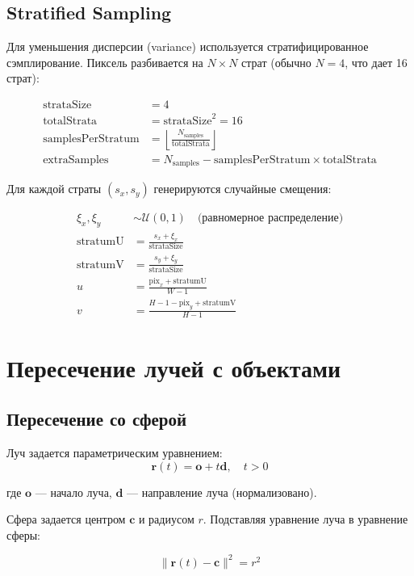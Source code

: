 \documentclass[14pt, a4paper]{extarticle}
\begin{document}
\subsection{Stratified Sampling}

Для уменьшения дисперсии (variance) используется стратифицированное сэмплирование. Пиксель разбивается на $N \times N$ страт (обычно $N = 4$, что дает 16 страт):

\begin{align}
\text{strataSize} &= 4 \\
\text{totalStrata} &= \text{strataSize}^2 = 16 \\
\text{samplesPerStratum} &= \left\lfloor \frac{N_{\text{samples}}}{\text{totalStrata}} \right\rfloor \\
\text{extraSamples} &= N_{\text{samples}} - \text{samplesPerStratum} \times \text{totalStrata}
\end{align}

Для каждой страты $(s_x, s_y)$ генерируются случайные смещения:

\begin{align}
\xi_x, \xi_y &\sim \mathcal{U}(0, 1) \quad \text{(равномерное распределение)} \\
\text{stratumU} &= \frac{s_x + \xi_x}{\text{strataSize}} \\
\text{stratumV} &= \frac{s_y + \xi_y}{\text{strataSize}} \\
u &= \frac{\text{pix}_x + \text{stratumU}}{W - 1} \\
v &= \frac{H - 1 - \text{pix}_y + \text{stratumV}}{H - 1}
\end{align}

\section{Пересечение лучей с объектами}

\subsection{Пересечение со сферой}

Луч задается параметрическим уравнением:
\[
\mathbf{r}(t) = \mathbf{o} + t\mathbf{d}, \quad t > 0
\]

где $\mathbf{o}$ --- начало луча, $\mathbf{d}$ --- направление луча (нормализовано).

Сфера задается центром $\mathbf{c}$ и радиусом $r$. Подставляя уравнение луча в уравнение сферы:

\[
\|\mathbf{r}(t) - \mathbf{c}\|^2 = r^2
\]
\end{document}
